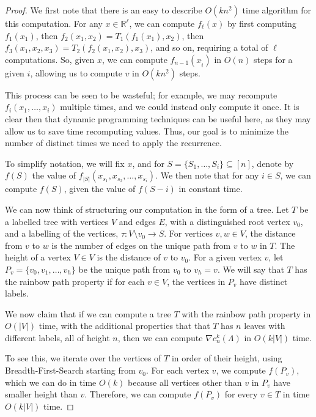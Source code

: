 \documentclass{amsart}
\theoremstyle{definition}
\newcommand{\R}{\mathbb{R}}
\begin{document}
\begin{proof}
    We first note that there is an easy to describe $O(kn^2)$ time algorithm for this computation.
    For any $x \in \R^{\ell}$, we can compute $f_{\ell}(x)$ by first computing $f_1(x_1)$, then $f_2(x_1,x_2) = T_1(f_1(x_1),x_2)$, then $f_3(x_1,x_2,x_3) = T_2(f_2(x_1,x_2), x_3)$, and so on, requiring a total of $\ell$ computations.
    So, given $x$, we can compute $f_{n-1}(x_{\hat{i}})$ in $O(n)$ steps for a given $i$, allowing us to compute $v$ in $O(kn^2)$ steps.

    This process can be seen to be wasteful; for example, we may recompute $f_i(x_1 ,\dots, x_i)$ multiple times, and we could instead only compute it once.
    It is clear then that dynamic programming techniques can be useful here, as they may allow us to save time recomputing values. 
    Thus, our goal is to minimize the number of distinct times we need to apply the recurrence.

    To simplify notation, we will fix $x$, and for $S = \{S_1 ,\dots, S_i\} \subseteq [n]$, denote by $f(S)$ the value of $f_{|S|}(x_{s_1},x_{s_2} ,\dots, x_{s_i})$. We then note that for any $i \in S$, we can compute $f(S)$, given the value of $f(S - i)$ in constant time.

    We can now think of structuring our computation in the form of a tree. 
    Let $T$ be a labelled tree with vertices $V$ and edges $E$, with a distinguished root vertex $v_0$, and a labelling of the vertices, $\tau : V \setminus v_0 \rightarrow S$.
    For vertices $v, w \in V$, the distance from $v$ to $w$ is the number of edges on the unique path from $v$ to $w$ in $T$.
    The height of a vertex $V \in V$ is the distance of $v$ to $v_0$.
    For a given vertex $v$, let $P_v = \{v_0,v_1 ,\dots, v_{h}\}$ be the unique path from $v_0$ to $v_h = v$.
    We will say that $T$ has the rainbow path property if for each $v \in V$, the vertices in $P_v$ have distinct labels.

    We now claim that if we can compute a tree $T$ with the rainbow path property in $O(|V|)$ time, with the additional properties that that $T$ has $n$ leaves with different labels, all of height $n$, then we can compute $\nabla c^k_n(\Lambda)$ in $O(k|V|)$ time.

    To see this, we iterate over the vertices of $T$ in order of their height, using Breadth-First-Search starting from $v_0$. 
    For each vertex $v$, we compute $f(P_v)$, which we can do in time $O(k)$ because all vertices other than $v$ in $P_v$ have smaller height than $v$.
    Therefore, we can compute $f(P_v)$ for every $v \in T$ in time $O(k|V|)$ time.


\end{proof}
\end{document}
